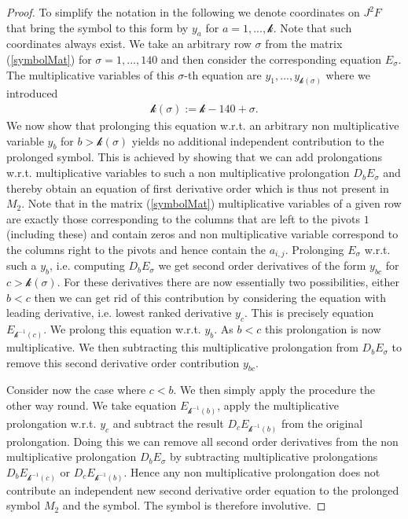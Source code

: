 \documentclass[a4paper,12pt, DIV=14, BCOR=5mm, twoside, headsepline]{scrbook}
\begin{document}
\begin{proof}
To simplify the notation in the following we denote coordinates on $J^2F$ that bring the symbol to this form by $y_a$ for $a = 1,...,\mathcal{k}$. Note that such coordinates always exist. We take an arbitrary row $\sigma$ from the matrix (\ref{symbolMat}) for $\sigma=1,...,140$ and then consider the corresponding equation $E_{\sigma}$. The multiplicative variables of this $\sigma$-th equation are $y_1,...,y_{\mathcal{k}(\sigma)}$ where we introduced 
\begin{align}
\mathcal{k}(\sigma):= \mathcal{k} -140 + \sigma.
\end{align}
We now show that prolonging this equation w.r.t. an arbitrary non multiplicative variable $y_b$ for $b>\mathcal{k}(\sigma)$ yields no additional independent contribution to the prolonged symbol. This is achieved by showing that we can add prolongations w.r.t. multiplicative variables to such a non multiplicative prolongation $D_bE_{\sigma}$ and thereby obtain an equation of first derivative order which is thus not present in $M_2$. Note that in the matrix (\ref{symbolMat}) multiplicative variables of a given row are exactly those corresponding to the columns that are left to the pivots $1$ (including these) and contain zeros and non multiplicative variable correspond to the columns right to the pivots and hence contain the $a_{i,j}$. Prolonging $E_{\sigma}$ w.r.t. such a $y_b$, i.e. computing $D_bE_{\sigma}$ we get second order derivatives of the form $y_{bc}$ for $c > \mathcal{k}(\sigma) $. For these derivatives there are now essentially two possibilities, either $b<c$ then we can get rid of this contribution by considering the equation with leading derivative, i.e. lowest ranked derivative $y_c$. This is precisely equation $E_{\mathcal{k}^{-1}(c)}$. We prolong this equation w.r.t. $y_b$. As $b<c$ this prolongation is now multiplicative. We then subtracting this multiplicative prolongation from $D_bE_{\sigma}$ to remove this second derivative order contribution $y_{bc}$.

Consider now the case where $c<b$. We then simply apply the procedure the other way round. We take equation $E_{\mathcal{k}^{-1}(b)}$, apply the multiplicative prolongation w.r.t. $y_c$ and subtract the result $D_cE_{\mathcal{k}^{-1}(b)}$ from the original prolongation. Doing this we can remove all second order derivatives from the non multiplicative prolongation $D_bE_{\sigma}$ by subtracting  multiplicative prolongations $D_bE_{\mathcal{k}^{-1}(c)}$ or $D_cE_{\mathcal{k}^{-1}(b)}$. Hence any non multiplicative prolongation does not contribute an independent new second derivative order equation to the prolonged symbol $M_2$ and the symbol. The symbol is therefore involutive. 


\end{proof}
\end{document}
